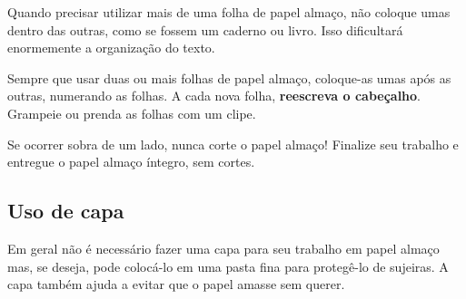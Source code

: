 Quando precisar utilizar mais de uma folha de papel almaço, não coloque umas
dentro das outras, como se fossem um caderno ou livro. Isso dificultará
enormemente a organização do texto.

Sempre que usar duas ou mais folhas de papel almaço, coloque-as umas após as
outras, numerando as folhas. A cada nova folha, \textbf{reescreva o
  cabeçalho}. Grampeie ou prenda as folhas com um clipe.
  
Se ocorrer sobra de um lado, nunca corte o papel almaço! Finalize seu trabalho e
entregue o papel almaço íntegro, sem cortes.


\subsection{Uso de capa}
\label{sec:como-capa}

Em geral não é necessário fazer uma capa para seu trabalho em papel almaço mas,
se deseja, pode colocá-lo em uma pasta fina para protegê-lo de sujeiras. A capa
também ajuda a evitar que o papel amasse sem querer.
